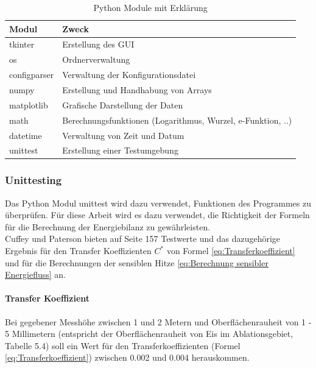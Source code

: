 \documentclass[12pt,a4paper]{article}
\begin{document}
\begin{table}[H]
\centering
{} 
\caption{Python Module mit Erklärung}
\label{tab:Python Module}
\begin{tabular}{|l|l|}
\hline
\textbf{Modul} & \textbf{Zweck}                                \\ \hline
tkinter             & Erstellung des GUI         \\
os             & Ordnerverwaltung         \\
configparser             & Verwaltung der Konfigurationsdatei         \\
numpy          & Erstellung und Handhabung von Arrays          \\
matplotlib     & Grafische Darstellung der Daten               \\
math		   & Berechnungsfunktionen (Logarithmus, Wurzel, e-Funktion, ..)   \\  
datetime		   & Verwaltung von Zeit und Datum   \\
unittest		   & Erstellung einer Testumgebung   \\  \hline


\end{tabular}
\end{table}
\vspace{0.3cm}

\subsubsection{Unittesting}
Das Python Modul unittest wird dazu verwendet, Funktionen des Programmes zu überprüfen. Für diese Arbeit wird es dazu verwendet, die Richtigkeit der Formeln für die Berechnung der Energiebilanz zu gewährleisten.\\

Cuffey und Paterson bieten auf Seite 157 Testwerte und das dazugehörige Ergebnis für den Transfer Koeffizienten $C^*$ von Formel \ref{eq:Transferkoeffizient} und für die Berechnungen der sensiblen Hitze \ref{eq:Berechnung sensibler Energiefluss} an.


\paragraph{Transfer Koeffizient}

Bei gegebener Messhöhe zwischen 1 und 2 Metern und Oberflächenrauheit von  1 - 5 Millimetern (entspricht der Oberflächenrauheit von Eis im Ablationsgebiet, Tabelle 5.4) soll ein Wert für den Transferkoeffizienten (Formel \ref{eq:Transferkoeffizient}) zwischen 0.002 und 0.004 herauskommen.\\
\end{document}

